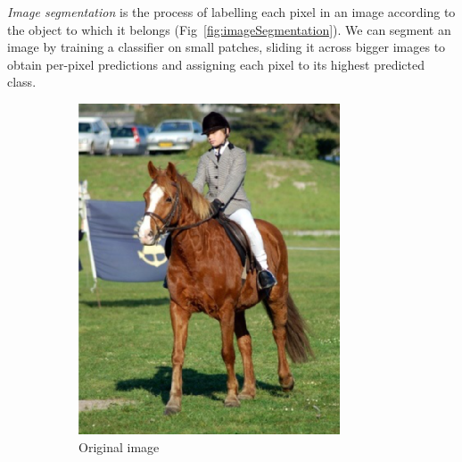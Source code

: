 \emph{Image segmentation} is the process of labelling each pixel in an image according to the object to which it belongs (Fig~\ref{fig:imageSegmentation}).
We can segment an image by training a classifier on small patches, sliding it across bigger images to obtain per-pixel predictions and assigning each pixel to its highest predicted class.
\begin{figure}[h]
	\centering
	\begin{subfigure}{0.26\textwidth}
                \includegraphics[width=\textwidth]{plots/segmentationImage.png}
		\caption{Original image}
        \end{subfigure}
	~
	\begin{subfigure}{0.26\textwidth}

\end{subfigure}
\end{figure}
